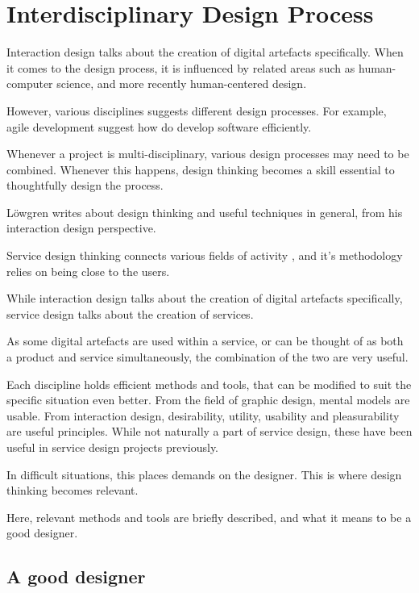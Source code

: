 \section{Interdisciplinary Design Process}

%

Interaction design talks about the creation of digital artefacts specifically. When it comes to the design process, it is influenced by related areas such as human-computer science, and more recently human-centered design.

However, various disciplines suggests different design processes. For example, agile development suggest how do develop software efficiently.

Whenever a project is multi-disciplinary, various design processes may need to be combined. Whenever this happens, design thinking becomes a skill essential to thoughtfully design the process.

Löwgren \cite{lowgren} writes about design thinking and useful techniques in general, from his interaction design perspective.

Service design thinking connects various fields of activity \cite{stickdorn}, and it's methodology relies on being close to the users.

While interaction design talks about the creation of digital artefacts specifically, service design talks about the creation of services.

As some digital artefacts are used within a service, or can be thought of as both a product and service simultaneously, the combination of the two are very useful.

Each discipline holds efficient methods and tools, that can be modified to suit the specific situation even better. From the field of graphic design, mental models are usable. From interaction design, desirability, utility, usability and pleasurability are useful principles. While not naturally a part of service design, these have been useful in service design projects previously. \cite{stickdorn}

In difficult situations, this places demands on the designer. This is where design thinking becomes relevant.

Here, relevant methods and tools are briefly described, and what it means to be a good designer.

\subsection{A good designer}

